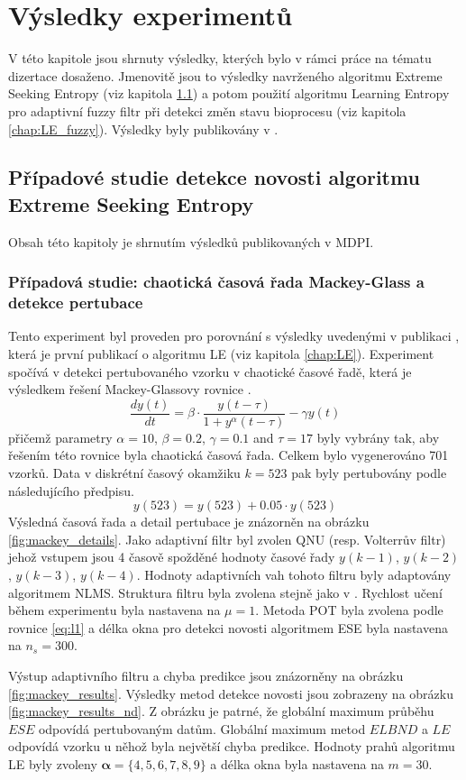 \chapter{Výsledky experimentů}
V této kapitole jsou shrnuty výsledky, kterých bylo v rámci práce na tématu dizertace dosaženo. Jmenovitě jsou to výsledky navrženého algoritmu Extreme Seeking Entropy (viz kapitola \ref{chap: ESE_vysledky}) a potom použití algoritmu Learning Entropy pro adaptivní fuzzy filtr při detekci změn stavu bioprocesu (viz kapitola \ref{chap:LE_fuzzy}). Výsledky byly publikovány v \cite{ese_mdpi}.
\section{Případové studie detekce novosti algoritmu Extreme Seeking Entropy}\label{chap: ESE_vysledky}
Obsah této kapitoly je shrnutím výsledků publikovaných v MDPI.
\subsection{Případová studie: chaotická časová řada Mackey-Glass a detekce pertubace}
Tento experiment byl proveden pro porovnání s výsledky uvedenými v publikaci \cite{ivoLE1}, která je první publikací o algoritmu LE (viz kapitola \ref{chap:LE}). Experiment spočívá v detekci pertubovaného vzorku v chaotické časové řadě, která je výsledkem řešení Mackey-Glassovy rovnice \cite{mackey}.
\begin{equation}
    \frac{dy(t)}{dt}= \beta \cdot \frac{ y(t-\tau)}{1 + y^\alpha(t-\tau)} - \gamma y(t)
\end{equation}
přičemž parametry $\alpha = 10$, $\beta = 0.2$, $\gamma = 0.1$ and $\tau = 17$ byly vybrány tak, aby řešením této rovnice byla chaotická časová řada. Celkem bylo vygenerováno 701 vzorků. Data v diskrétní časový okamžiku $k=523$ pak byly pertubovány podle následujícího předpisu.
\begin{equation}
    y(523) = y(523) + 0.05 \cdot y(523)
\end{equation}
Výsledná časová řada a detail pertubace je znázorněn na obrázku \ref{fig:mackey_details}. Jako adaptivní filtr byl zvolen QNU (resp. Volterrův filtr) jehož vstupem jsou 4 časově spožděné hodnoty časové řady $y(k-1)$, $y(k-2)$, $y(k-3)$, $y(k-4)$. Hodnoty adaptivních vah tohoto filtru byly adaptovány algoritmem NLMS. Struktura filtru byla zvolena stejně jako v \cite{ivoLE1}. Rychlost učení během experimentu byla nastavena na $\mu=1$. Metoda POT byla zvolena podle rovnice \ref{eq:l1} a délka okna pro detekci novosti algoritmem ESE byla nastavena na $n_s=300$. 
\par 
Výstup adaptivního filtru a chyba predikce jsou znázorněny na obrázku \ref{fig:mackey_results}. Výsledky metod detekce novosti jsou zobrazeny na obrázku \ref{fig:mackey_results_nd}. Z obrázku je patrné, že globální maximum průběhu $ESE$ odpovídá pertubovaným datům. Globální maximum metod $ELBND$ a $LE$ odpovídá vzorku u něhož byla největší chyba predikce. Hodnoty prahů algoritmu LE byly zvoleny $\boldsymbol{\alpha}=\{4,5,6,7,8,9\}$ a délka okna byla nastavena na $m=30$.


